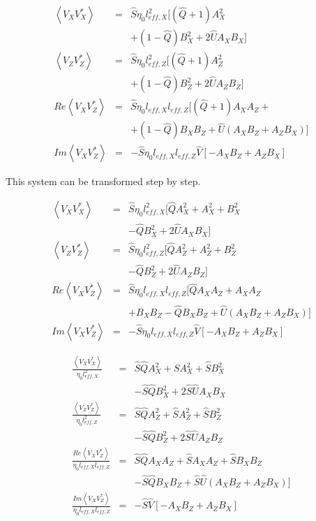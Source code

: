 \documentclass[a4paper,11pt]{report}
\begin{document}
\begin{eqnarray}
\left\langle V_X V_X^{*} \right\rangle &=& \hat{S}\eta_0 l_{eff,X}^2[(\hat{Q}+1) A^2_X   \\
&&+ (1-\hat{Q}) B^2_X+ 2 \hat{U}A_X B_X]  \nonumber \\
\left\langle V_Z V_Z^{*} \right\rangle &=& \hat{S}\eta_0 l_{eff,Z}^2[(\hat{Q}+1) A^2_Z   \\
&& + (1-\hat{Q}) B^2_Z+ 2 \hat{U}A_Z B_Z]  \nonumber \\
Re \left\langle V_X V_Z^{*}\right\rangle &=& \hat{S}\eta_0 l_{eff,X} l_{eff,Z}[(\hat{Q}+1) A_X A_Z +\\
&&+  (1-\hat{Q}) B_X B_Z + \hat{U} (A_X B_Z + A_Z B_X)] \nonumber \\
Im \left\langle V_X V_Z^{*}\right\rangle &=& -\hat{S}\eta_0 l_{eff,X} l_{eff,Z} \hat{V}[-A_X B_Z + A_Z B_X ]
\end{eqnarray}

This system can be transformed step by step.

\begin{eqnarray}
\left\langle V_X V_X^{*} \right\rangle &=& \hat{S}\eta_0 l_{eff,X}^2[\hat{Q}A^2_X+A^2_X + B^2_X \\
&&-\hat{Q} B^2_X+ 2 \hat{U}A_X B_X] \nonumber  \\
\left\langle V_Z V_Z^{*} \right\rangle &=& \hat{S}\eta_0 l_{eff,Z}^2[\hat{Q}A^2_Z+A^2_Z + B^2_Z\\
&&-\hat{Q} B^2_Z+ 2 \hat{U}A_Z B_Z]  \nonumber \\
Re \left\langle V_X V_Z^{*}\right\rangle &=& \hat{S}\eta_0 l_{eff,X} l_{eff,Z}[\hat{Q}A_X A_Z+ A_X A_Z  \\
&&+  B_X B_Z-\hat{Q} B_X B_Z +  \hat{U} (A_X B_Z + A_Z B_X)] \nonumber \\
Im \left\langle V_X V_Z^{*}\right\rangle &=& -\hat{S}\eta_0 l_{eff,X} l_{eff,Z} \hat{V}[-A_X B_Z + A_Z B_X ]
\end{eqnarray}

\begin{eqnarray}
\frac{\left\langle V_X V_X^{*} \right\rangle }{\eta_0 l_{eff,X}^2}&=& \hat{S}\hat{Q}A^2_X+\hat{S}A^2_X + \hat{S}B^2_X\\
&&-\hat{S}\hat{Q} B^2_X+ 2 \hat{S}\hat{U}A_X B_X \nonumber \\
\frac{\left\langle V_Z V_Z^{*} \right\rangle }{\eta_0 l_{eff,Z}^2}&=& \hat{S}\hat{Q}A^2_Z+\hat{S}A^2_Z + \hat{S}B^2_Z\\
&&-\hat{S}\hat{Q} B^2_Z+ 2 \hat{S}\hat{U}A_Z B_Z   \nonumber \\
\frac{Re \left\langle V_X V_Z^{*}\right\rangle }{\eta_0 l_{eff,X} l_{eff,Z}}&=& \hat{S}\hat{Q}A_X A_Z+ \hat{S}A_X A_Z +  \hat{S}B_X B_Z\\
&&-\hat{S}\hat{Q} B_X B_Z + \hat{S}\hat{U} (A_X B_Z + A_Z B_X)] \nonumber \\
\frac{Im \left\langle V_X V_Z^{*}\right\rangle }{\eta_0 l_{eff,X} l_{eff,Z}}&=& -\hat{S} \hat{V}[-A_X B_Z + A_Z B_X ]
\end{eqnarray}
\end{document}
